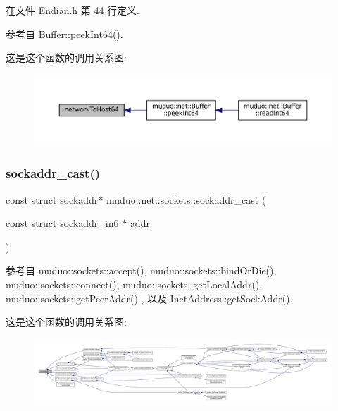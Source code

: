 在文件 Endian.\+h 第 44 行定义.



参考自 Buffer\+::peek\+Int64().

这是这个函数的调用关系图\+:
\nopagebreak
\begin{figure}[H]
\begin{center}
\leavevmode
\includegraphics[width=350pt]{namespacemuduo_1_1net_1_1sockets_a590d67f0a8d4f8ff19462c08ebfb99b0_icgraph}
\end{center}
\end{figure}
\mbox{\label{namespacemuduo_1_1net_1_1sockets_ad69bf980a58ef6798c4e1dbe5497d52c}} 
\subsubsection{\texorpdfstring{sockaddr\+\_\+cast()}{sockaddr\_cast()}}
{\footnotesize\ttfamily const struct sockaddr$\ast$ muduo\+::net\+::sockets\+::sockaddr\+\_\+cast (\begin{DoxyParamCaption}\item[{const struct sockaddr\+\_\+in6 $\ast$}]{addr }\end{DoxyParamCaption})}



参考自 muduo\+::sockets\+::accept(), muduo\+::sockets\+::bind\+Or\+Die(), muduo\+::sockets\+::connect(), muduo\+::sockets\+::get\+Local\+Addr(), muduo\+::sockets\+::get\+Peer\+Addr() , 以及 Inet\+Address\+::get\+Sock\+Addr().

这是这个函数的调用关系图\+:
\nopagebreak
\begin{figure}[H]
\begin{center}
\leavevmode
\includegraphics[width=350pt]{namespacemuduo_1_1net_1_1sockets_ad69bf980a58ef6798c4e1dbe5497d52c_icgraph}
\end{center}
\end{figure}
